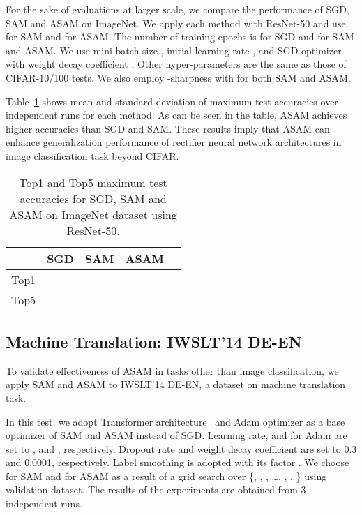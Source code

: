 \documentclass{article}
\begin{document}
For the sake of evaluations at larger scale, we compare the performance of SGD, SAM and ASAM on ImageNet. We apply each method with ResNet-50 and use  for SAM and  for ASAM. The number of training epochs is  for SGD and  for SAM and ASAM. We use mini-batch size , initial learning rate , and SGD optimizer with weight decay coefficient . Other hyper-parameters are the same as those of CIFAR-10/100 tests. We also employ -sharpness with  for both SAM and ASAM.

Table~\ref{imagenet} shows mean and standard deviation of maximum test accuracies over  independent runs for each method. As can be seen in the table, ASAM achieves higher accuracies than SGD and SAM. These results imply that ASAM can enhance generalization performance of rectifier neural network architectures in image classification task beyond CIFAR.


\begin{table}[h]
\setlength\tabcolsep{4.5pt}
\caption{Top1 and Top5 maximum test accuracies for SGD, SAM and ASAM on ImageNet dataset using ResNet-50. \label{imagenet}}
\begin{center}
\begin{small}
\begin{tabular}{lcccc}
\toprule
& SGD & SAM & ASAM\\
\midrule
Top1 &  &  & \\
Top5 &  &  & \\
\bottomrule
\end{tabular}
\end{small}
\end{center}
\end{table}

\subsection{Machine Translation: IWSLT'14 DE-EN}
To validate effectiveness of ASAM in tasks other than image classification, we apply SAM and ASAM to IWSLT'14 DE-EN, a dataset on machine translation task. 

In this test, we adopt Transformer architecture~\citep{vaswani2017attention} and Adam optimizer as a base optimizer of SAM and ASAM instead of SGD. Learning rate,  and  for Adam are set to ,  and , respectively. Dropout rate and weight decay coefficient are set to 0.3 and 0.0001, respectively. Label smoothing is adopted with its factor . We choose  for SAM and  for ASAM as a result of a grid search over \{, , , \ldots, , , \} using validation dataset. The results of the experiments are obtained from 3 independent runs.
\end{document}
